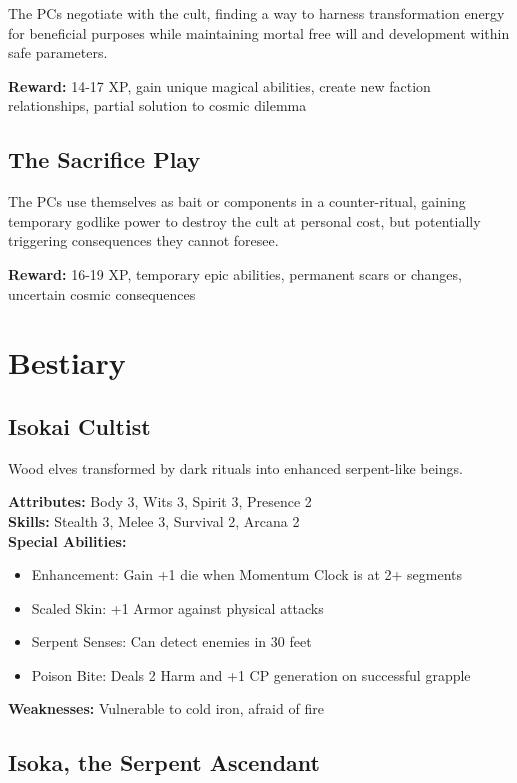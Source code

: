 \documentclass[12pt,twoside]{article}
\begin{document}
The PCs negotiate with the cult, finding a way to harness transformation energy for beneficial purposes while maintaining mortal free will and development within safe parameters.

\textbf{Reward:} 14-17 XP, gain unique magical abilities, create new faction relationships, partial solution to cosmic dilemma

\subsection{The Sacrifice Play}

The PCs use themselves as bait or components in a counter-ritual, gaining temporary godlike power to destroy the cult at personal cost, but potentially triggering consequences they cannot foresee.

\textbf{Reward:} 16-19 XP, temporary epic abilities, permanent scars or changes, uncertain cosmic consequences

\section{Bestiary}

\subsection{Isokai Cultist}

Wood elves transformed by dark rituals into enhanced serpent-like beings.

\textbf{Attributes:} Body 3, Wits 3, Spirit 3, Presence 2 \\
\textbf{Skills:} Stealth 3, Melee 3, Survival 2, Arcana 2 \\
\textbf{Special Abilities:}
\begin{itemize}
  \item Enhancement: Gain +1 die when Momentum Clock is at 2+ segments
  \item Scaled Skin: +1 Armor against physical attacks
  \item Serpent Senses: Can detect enemies in 30 feet
  \item Poison Bite: Deals 2 Harm and +1 CP generation on successful grapple
\end{itemize}
\textbf{Weaknesses:} Vulnerable to cold iron, afraid of fire

\subsection{Isoka, the Serpent Ascendant}
\end{document}
